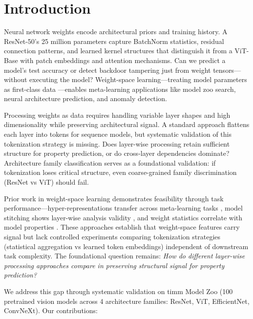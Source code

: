 \section{Introduction}

Neural network weights encode architectural priors and training history. A ResNet-50's 25 million parameters capture BatchNorm statistics, residual connection patterns, and learned kernel structures that distinguish it from a ViT-Base with patch embeddings and attention mechanisms. Can we predict a model's test accuracy or detect backdoor tampering just from weight tensors—without executing the model? Weight-space learning—treating model parameters as first-class data \cite{schurholt2022hyper}—enables meta-learning applications like model zoo search, neural architecture prediction, and anomaly detection.

Processing weights as data requires handling variable layer shapes and high dimensionality while preserving architectural signal. A standard approach flattens each layer into tokens for sequence models, but systematic validation of this tokenization strategy is missing. Does layer-wise processing retain sufficient structure for property prediction, or do cross-layer dependencies dominate? Architecture family classification serves as a foundational validation: if tokenization loses critical structure, even coarse-grained family discrimination (ResNet vs ViT) should fail.

Prior work in weight-space learning demonstrates feasibility through task performance—hyper-representations transfer across meta-learning tasks \cite{schurholt2022hyper}, model stitching shows layer-wise analysis validity \cite{lenc2015understanding}, and weight statistics correlate with model properties \cite{unterthiner2020predicting}. These approaches establish that weight-space features carry signal but lack controlled experiments comparing tokenization strategies (statistical aggregation vs learned token embeddings) independent of downstream task complexity. The foundational question remains: \textit{How do different layer-wise processing approaches compare in preserving structural signal for property prediction?}

We address this gap through systematic validation on timm Model Zoo (100 pretrained vision models across 4 architecture families: ResNet, ViT, EfficientNet, ConvNeXt). Our contributions:

